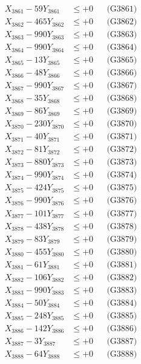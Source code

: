 \documentclass[a4paper,10pt]{article}
\begin{document}
{\begin{align}
\allowbreak
X_{3861} - 59Y_{3861} &\leq +0 && \text{(G3861)} \\
X_{3862} - 465Y_{3862} &\leq +0 && \text{(G3862)} \\
X_{3863} - 990Y_{3863} &\leq +0 && \text{(G3863)} \\
X_{3864} - 990Y_{3864} &\leq +0 && \text{(G3864)} \\
X_{3865} - 13Y_{3865} &\leq +0 && \text{(G3865)} \\
X_{3866} - 48Y_{3866} &\leq +0 && \text{(G3866)} \\
X_{3867} - 990Y_{3867} &\leq +0 && \text{(G3867)} \\
X_{3868} - 35Y_{3868} &\leq +0 && \text{(G3868)} \\
X_{3869} - 86Y_{3869} &\leq +0 && \text{(G3869)} \\
X_{3870} - 230Y_{3870} &\leq +0 && \text{(G3870)} \\
\allowbreak
X_{3871} - 40Y_{3871} &\leq +0 && \text{(G3871)} \\
X_{3872} - 81Y_{3872} &\leq +0 && \text{(G3872)} \\
X_{3873} - 880Y_{3873} &\leq +0 && \text{(G3873)} \\
X_{3874} - 990Y_{3874} &\leq +0 && \text{(G3874)} \\
X_{3875} - 424Y_{3875} &\leq +0 && \text{(G3875)} \\
X_{3876} - 990Y_{3876} &\leq +0 && \text{(G3876)} \\
X_{3877} - 101Y_{3877} &\leq +0 && \text{(G3877)} \\
X_{3878} - 438Y_{3878} &\leq +0 && \text{(G3878)} \\
X_{3879} - 83Y_{3879} &\leq +0 && \text{(G3879)} \\
X_{3880} - 455Y_{3880} &\leq +0 && \text{(G3880)} \\
\allowbreak
X_{3881} - 61Y_{3881} &\leq +0 && \text{(G3881)} \\
X_{3882} - 106Y_{3882} &\leq +0 && \text{(G3882)} \\
X_{3883} - 990Y_{3883} &\leq +0 && \text{(G3883)} \\
X_{3884} - 50Y_{3884} &\leq +0 && \text{(G3884)} \\
X_{3885} - 248Y_{3885} &\leq +0 && \text{(G3885)} \\
X_{3886} - 142Y_{3886} &\leq +0 && \text{(G3886)} \\
X_{3887} - 3Y_{3887} &\leq +0 && \text{(G3887)} \\
X_{3888} - 64Y_{3888} &\leq +0 && \text{(G3888)} \\

\end{align}}
\end{document}
